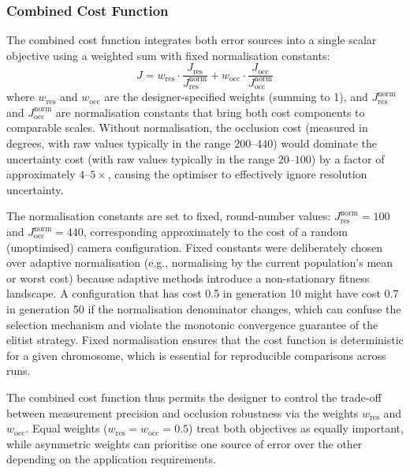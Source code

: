 \subsubsection{Combined Cost Function}
\label{sec:combined-cost}

The combined cost function integrates both error sources into a single scalar objective using a weighted sum with fixed normalisation constants:
%
\begin{equation}
\label{eq:combined-cost}
J = w_{\text{res}} \cdot \frac{J_{\text{res}}}{J_{\text{res}}^{\text{norm}}} + w_{\text{occ}} \cdot \frac{J_{\text{occ}}}{J_{\text{occ}}^{\text{norm}}}
\end{equation}
%
where $w_{\text{res}}$ and $w_{\text{occ}}$ are the designer-specified weights (summing to 1), and $J_{\text{res}}^{\text{norm}}$ and $J_{\text{occ}}^{\text{norm}}$ are normalisation constants that bring both cost components to comparable scales. Without normalisation, the occlusion cost (measured in degrees, with raw values typically in the range $200$--$440$) would dominate the uncertainty cost (with raw values typically in the range $20$--$100$) by a factor of approximately $4$--$5\times$, causing the optimiser to effectively ignore resolution uncertainty.

The normalisation constants are set to fixed, round-number values: $J_{\text{res}}^{\text{norm}} = 100$ and $J_{\text{occ}}^{\text{norm}} = 440$, corresponding approximately to the cost of a random (unoptimised) camera configuration. Fixed constants were deliberately chosen over adaptive normalisation (e.g., normalising by the current population's mean or worst cost) because adaptive methods introduce a non-stationary fitness landscape. A configuration that has cost 0.5 in generation 10 might have cost 0.7 in generation 50 if the normalisation denominator changes, which can confuse the selection mechanism and violate the monotonic convergence guarantee of the elitist strategy. Fixed normalisation ensures that the cost function is deterministic for a given chromosome, which is essential for reproducible comparisons across runs.

The combined cost function thus permits the designer to control the trade-off between measurement precision and occlusion robustness via the weights $w_{\text{res}}$ and $w_{\text{occ}}$. Equal weights ($w_{\text{res}} = w_{\text{occ}} = 0.5$) treat both objectives as equally important, while asymmetric weights can prioritise one source of error over the other depending on the application requirements.

